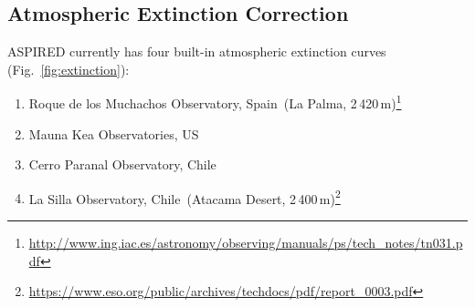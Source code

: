 \documentclass[linenumbers, twocolumn]{aastex631}
\begin{document}
\subsection{Atmospheric Extinction Correction}
\textsc{ASPIRED} currently has four built-in atmospheric extinction curves (Fig.~\ref{fig:extinction}):

\begin{enumerate}
    \item Roque de los Muchachos Observatory, Spain~(La Palma, 2\,420\,m)\footnote{\url{http://www.ing.iac.es/astronomy/observing/manuals/ps/tech\_notes/tn031.pdf}}
    \item Mauna Kea Observatories, US~\citep[Big Island, Hawaii, 4\,205\,m;][]{2013A&A...549A...8B}
    \item Cerro Paranal Observatory, Chile~\citep[Atacama Desert, 2\,635\,m;][]{2011A&A...527A..91P}
    \item La Silla Observatory, Chile~(Atacama Desert, 2\,400\,m)\footnote{\url{https://www.eso.org/public/archives/techdocs/pdf/report\_0003.pdf}}
\end{enumerate}
\end{document}
